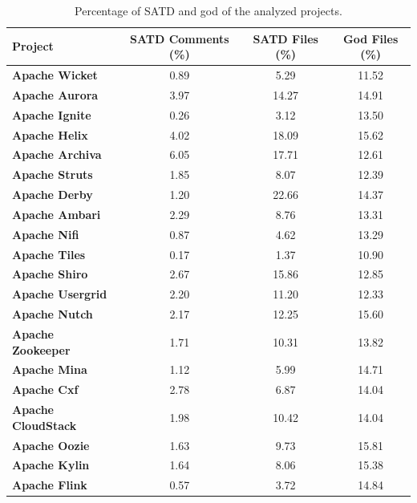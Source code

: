 \begin{landscape}
	
	
	
	\begin{table}[htbp]
		\small
		\centering
		\caption{Percentage of SATD and god of the analyzed projects.}
		\begin{adjustbox}{width=1.0\textwidth}
			
			
			\begin{tabular}{l|c|c|c}
				\hline
				\textbf{Project}  & \textbf{SATD Comments (\%)}  & \textbf{SATD Files (\%)} & \textbf{God Files (\%)} \\ \hline
				\textbf{Apache Wicket} &  0.89 & 5.29 & 11.52    \\ \hline
				\textbf{Apache Aurora} &  3.97 & 14.27 & 14.91    \\ \hline
				\textbf{Apache Ignite} &  0.26 & 3.12 & 13.50   \\ \hline
				\textbf{Apache Helix} &  4.02 & 18.09 & 15.62    \\ \hline
				\textbf{Apache Archiva} &  6.05 & 17.71 & 12.61    \\ \hline
				\textbf{Apache Struts} &  1.85 & 8.07 & 12.39    \\ \hline
				\textbf{Apache Derby} &  1.20 & 22.66 & 14.37    \\ \hline
				\textbf{Apache Ambari} &  2.29 & 8.76 & 13.31   \\ \hline
				\textbf{Apache Nifi} &  0.87 & 4.62 & 13.29    \\ \hline
				\textbf{Apache Tiles} &  0.17 & 1.37 & 10.90    \\ \hline
				\textbf{Apache Shiro} &  2.67 & 15.86 & 12.85    \\ \hline
				\textbf{Apache Usergrid} &  2.20 & 11.20 & 12.33    \\ \hline
				\textbf{Apache Nutch} &  2.17 & 12.25 & 15.60    \\ \hline
				\textbf{Apache Zookeeper} &  1.71 & 10.31 & 13.82   \\ \hline
				\textbf{Apache Mina} &  1.12 & 5.99 & 14.71   \\ \hline
				\textbf{Apache Cxf} &  2.78 & 6.87 & 14.04   \\ \hline
				\textbf{Apache CloudStack} &  1.98 & 10.42 & 14.04   \\ \hline
				\textbf{Apache Oozie} &  1.63 & 9.73 & 15.81   \\ \hline
				\textbf{Apache Kylin} &  1.64 & 8.06 & 15.38   \\ \hline
				\textbf{Apache Flink} &  0.57 & 3.72 & 14.84   \\ \hline
				
			\end{tabular}
			\label{table:projects_satd_god_percentage2}
			
		\end{adjustbox}
		
	\end{table}
	
\end{landscape}


